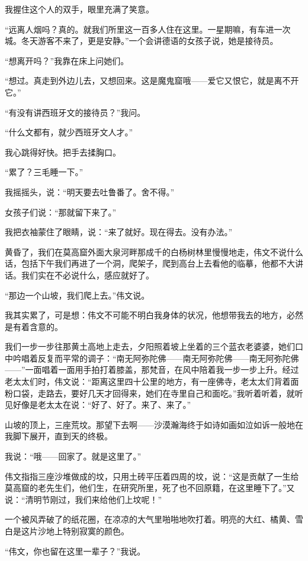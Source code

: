 \par 我握住这个人的双手，眼里充满了笑意。
\par “远离人烟吗？真的。就我们所里这一百多人住在这里。一星期嘛，有车进一次城。冬天游客不来了，更是安静。”一个会讲德语的女孩子说，她是接待员。
\par “想离开吗？”我靠在床上问她们。
\par “想过。真走到外边儿去，又想回来。这是魔鬼窟哦——爱它又恨它，就是离不开它。”
\par “有没有讲西班牙文的接待员？”我问。
\par “什么文都有，就少西班牙文人才。”
\par 我心跳得好快。把手去揉胸口。
\par “累了？三毛睡一下。”
\par 我摇摇头，说：“明天要去吐鲁番了。舍不得。”
\par 女孩子们说：“那就留下来了。”
\par 我把衣袖蒙住了眼睛，说：“来了就好。现在得去。没有办法。”
\par 
\par 黄昏了，我们在莫高窟外面大泉河畔那成千的白杨树林里慢慢地走，伟文不说什么话，包括下午我们再进了一个洞，爬架子，爬到高台上去看他的临摹，他都不大讲话。我们实在不必说什么，感应就好了。
\par “那边一个山坡，我们爬上去。”伟文说。
\par 我其实累了，可是想：伟文不可能不明白我身体的状况，他想带我去的地方，必然是有着含意的。
\par 我们一步一步往那黄土高地上走去，夕阳照着坡上坐着的三个蓝衣老婆婆，她们口中吟唱着反复而平常的调子：“南无阿弥陀佛——南无阿弥陀佛——南无阿弥陀佛——”一面唱着一面用手拍打着膝盖，那梵音，在风中陪着我一步一步上升。经过老太太们时，伟文说：“距离这里四十公里的地方，有一座佛寺，老太太们背着面粉口袋，走路去，要好几天才回得来，她们在寺里自己和面吃。”我听着听着，就听见好像是老太太在说：“好了、好了。来了、来了。”
\par 山坡的顶上，三座荒坟。那望下去啊——沙漠瀚海终于如诗如画如泣如诉一般地在我脚下展开，直到天的终极。
\par 我说：“哦——回家了。就是这里了。”
\par 伟文指指三座沙堆做成的坟，只用土砖平压着四周的坟，说：“这是贡献了一生给莫高窟的老先生们，他们生，在研究所里，死了也不回原籍，在这里睡下了。”又说：“清明节刚过，我们来给他们上坟呢！”
\par 一个被风弄破了的纸花圈，在凉凉的大气里啪啪地吹打着。明亮的大红、橘黄、雪白是这片沙地上特别寂寞的颜色。
\par “伟文，你也留在这里一辈子？”我说。
